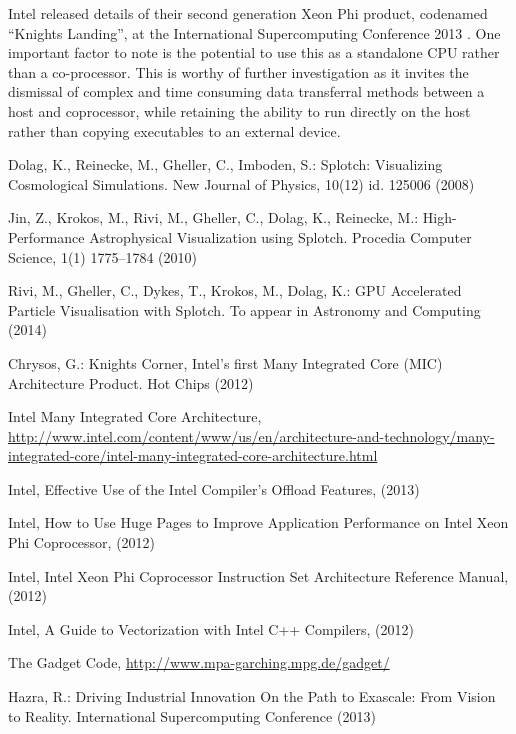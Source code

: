 \documentclass[runningheads,a4paper]{llncs}
\begin{document}
Intel released details of their second generation Xeon Phi product, codenamed “Knights Landing”,  at the International Supercomputing 
Conference 2013 \cite{knightlanding}. One important factor to note is the potential to use this as a standalone CPU rather than a co-processor. 
This is worthy of further investigation as it invites the dismissal of complex and time consuming data transferral methods between 
a host and coprocessor, while retaining the ability to run directly on the host rather than copying executables to an external device.

\begin{thebibliography}{4}

Dolag, K., Reinecke, M., Gheller, C., Imboden, S.: Splotch: Visualizing Cosmological Simulations. New Journal of Physics, 10(12)  id. 125006 (2008)

Jin, Z., Krokos, M., Rivi, M., Gheller, C., Dolag, K., Reinecke, M.: High-Performance Astrophysical Visualization using Splotch. 
  Procedia Computer Science, 1(1) 1775--1784 (2010)

Rivi, M., Gheller, C., Dykes, T., Krokos, M., Dolag, K.:  GPU Accelerated
  Particle Visualisation with Splotch. To appear in Astronomy and Computing (2014)
  
Chrysos, G.: Knights Corner, Intel’s first Many Integrated Core (MIC) Architecture Product. 
  Hot Chips (2012) 

Intel Many Integrated Core Architecture, 
  \url{http://www.intel.com/content/www/us/en/architecture-and-technology/many-integrated-core/intel-many-integrated-core-architecture.html}

 Intel, Effective Use of the Intel Compiler's Offload Features, (2013)

Intel, How to Use Huge Pages to Improve Application Performance on Intel Xeon Phi Coprocessor, (2012)

Intel, Intel Xeon Phi Coprocessor Instruction Set Architecture Reference Manual, (2012)

Intel, A Guide to Vectorization with Intel C++ Compilers, (2012)

The Gadget Code, \url{http://www.mpa-garching.mpg.de/gadget/}

Hazra, R.: Driving Industrial Innovation On the Path to Exascale: From Vision to Reality. 
  International Supercomputing Conference (2013)

\end{thebibliography}
\end{document}
